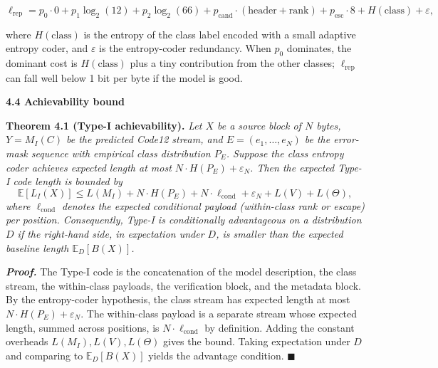 \documentclass[
]{article}
\begin{document}
\[
\ell_{\text{rep}} = p_0 \cdot 0 + p_1 \log_2(12) + p_2 \log_2(66) + p_{\text{cand}} \cdot (\text{header} + \text{rank}) + p_{\text{esc}} \cdot 8 + H(\text{class}) + \varepsilon,
\tag{4.1}
\]

where $H(\text{class})$ is the entropy of the class label encoded with
a small adaptive entropy coder, and $\varepsilon$ is the entropy-coder
redundancy. When $p_0$ dominates, the dominant cost is $H(\text{class})$
plus a tiny contribution from the other classes; $\ell_{\text{rep}}$
can fall well below 1 bit per byte if the model is good.

\textbf{4.4 Achievability bound}

\textbf{Theorem 4.1 (Type-I achievability).} \emph{Let $X$ be a source
block of $N$ bytes, $Y = M_I(C)$ be the predicted Code12 stream, and
$E = (e_1, \ldots, e_N)$ be the error-mask sequence with empirical
class distribution $P_E$. Suppose the class entropy coder achieves
expected length at most $N \cdot H(P_E) + \varepsilon_N$. Then the
expected Type-I code length is bounded by}
\[
\mathbb{E}[L_I(X)] \leq L(M_I) + N \cdot H(P_E) + N \cdot \ell_{\text{cond}} + \varepsilon_N + L(V) + L(\Theta),
\tag{4.2}
\]
\emph{where $\ell_{\text{cond}}$ denotes the expected conditional
payload (within-class rank or escape) per position. Consequently,
Type-I is conditionally advantageous on a distribution $D$ if the
right-hand side, in expectation under $D$, is smaller than the
expected baseline length $\mathbb{E}_D[B(X)]$.}

\emph{\textbf{Proof.}} The Type-I code is the concatenation of the
model description, the class stream, the within-class payloads, the
verification block, and the metadata block. By the entropy-coder
hypothesis, the class stream has expected length at most
$N \cdot H(P_E) + \varepsilon_N$. The within-class payload is a
separate stream whose expected length, summed across positions, is
$N \cdot \ell_{\text{cond}}$ by definition. Adding the constant
overheads $L(M_I), L(V), L(\Theta)$ gives the bound. Taking
expectation under $D$ and comparing to $\mathbb{E}_D[B(X)]$ yields
the advantage condition. \hfill$\blacksquare$
\end{document}
